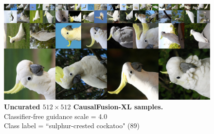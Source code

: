 \begin{figure}\centering
\includegraphics[width=\linewidth]{figs/xl512_89_cfg1.5.jpg}
\caption{\textbf{Uncurated $512\times512$ CausalFusion-XL samples.} \\Classifier-free guidance scale = 4.0\\Class label = ``sulphur-crested cockatoo" (89)}\vspace{-2mm}
\label{fig:samples512_7}
\end{figure}

